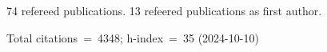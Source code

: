 74 refereed publications. 13 refeered publications as first author.

Total citations~=~4348; h-index~=~35 (2024-10-10)
